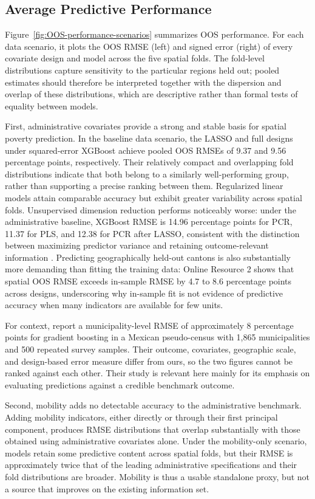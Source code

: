 \documentclass[pdflatex,sn-apa]{sn-jnl}
\begin{document}
\subsection{Average Predictive Performance}

Figure~\ref{fig:OOS-performance-scenarios} summarizes OOS performance. For each data scenario, it plots the OOS RMSE (left) and signed error (right) of every covariate design and model across the five spatial folds. The fold-level distributions capture sensitivity to the particular regions held out; pooled estimates should therefore be interpreted together with the dispersion and overlap of these distributions, which are descriptive rather than formal tests of equality between models.

First, administrative covariates provide a strong and stable basis for spatial poverty prediction. In the baseline data scenario, the LASSO and full designs under squared-error XGBoost achieve pooled OOS RMSEs of 9.37 and 9.56 percentage points, respectively. Their relatively compact and overlapping fold distributions indicate that both belong to a similarly well-performing group, rather than supporting a precise ranking between them. Regularized linear models attain comparable accuracy but exhibit greater variability across spatial folds. Unsupervised dimension reduction performs noticeably worse: under the administrative baseline, XGBoost RMSE is 14.96 percentage points for PCR, 11.37 for PLS, and 12.38 for PCR after LASSO, consistent with the distinction between maximizing predictor variance and retaining outcome-relevant information \citep{Bair2006, bai2008forecasting}. Predicting geographically held-out cantons is also substantially more demanding than fitting the training data: Online Resource 2 shows that spatial OOS RMSE exceeds in-sample RMSE by 4.7 to 8.6 percentage points across designs, underscoring why in-sample fit is not evidence of predictive accuracy when many indicators are available for few units.

For context, \citet{Corral2025} report a municipality-level RMSE of approximately 8 percentage points for gradient boosting in a Mexican pseudo-census with 1,865 municipalities and 500 repeated survey samples. Their outcome, covariates, geographic scale, and design-based error measure differ from ours, so the two figures cannot be ranked against each other. Their study is relevant here mainly for its emphasis on evaluating predictions against a credible benchmark outcome.

Second, mobility adds no detectable accuracy to the administrative benchmark. Adding mobility indicators, either directly or through their first principal component, produces RMSE distributions that overlap substantially with those obtained using administrative covariates alone. Under the mobility-only scenario, models retain some predictive content across spatial folds, but their RMSE is approximately twice that of the leading administrative specifications and their fold distributions are broader. Mobility is thus a usable standalone proxy, but not a source that improves on the existing information set.
\end{document}
